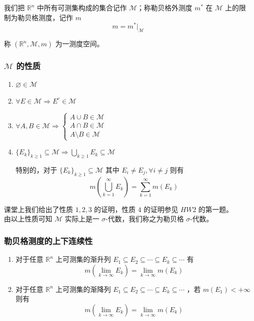 \documentclass{ctexbook}
\newcommand{\no}{\noindent}
\newcommand{\pro}{\no{\bf 证明：}}
\newcommand{\R}{\mathbb{R}}
\newcommand{\ITEMS}{\begin{enumerate}[leftmargin=4em]}
\newcommand{\ITEME}{\end{enumerate}}
\begin{document}
我们把 $\R^n$ 中所有可测集构成的集合记作 $\mathcal{M}$；称勒贝格外测度 $m^*$ 在 $\mathcal{M}$ 上的限制为勒贝格测度，记作 $m$
\[
	m = m^*|_\mathcal{M} 
\]

称 $(\R^n,\mathcal{M},m)$ 为一测度空间。

\subsubsection{$\mathcal{M}$ 的性质}
\ITEMS
	\item $\varnothing \in \mathcal{M}$
	\item $\forall E\in \mathcal{M} \Rightarrow E^c\in \mathcal{M}$
	\item $\forall A,B \in \mathcal{M} \Rightarrow \begin{cases} A \cup B \in \mathcal{M}\\ A \cap B \in \mathcal{M}\\ A \setminus B \in \mathcal{M}\end{cases}$
	\item $\{E_k\}_{k\ge1} \subseteq \mathcal{M} \Rightarrow \bigcup\limits_{k\ge1} E_k \subseteq \mathcal{M}$ 
	
	特别的，对于 $\{E_k\}_{k\ge1} \subseteq \mathcal{M}$ 其中 $E_i \neq E_j,\forall i\neq j$ 则有
	\[
		m\left(\bigcup_{k=1}^\infty E_k\right) = \sum_{k=1}^\infty m\left( E_k\right)
	\]
\ITEME

\pro 课堂上我们给出了性质 $1, 2, 3$ 的证明，性质 $4$ 的证明参见 $HW2$ 的第一题。\\

由以上性质可知 $\mathcal{M}$ 实际上是一 $\sigma$-代数，我们称之为勒贝格 $\sigma$-代数。

\subsubsection{勒贝格测度的上下连续性}
\ITEMS
	\item 对于任意 $\R^n$ 上可测集的渐升列 $E_1 \subseteq E_2 \subseteq \cdots \subseteq E_k \subseteq \cdots$ 有
	\[
		m\left(\lim_{k\to\infty} E_k\right) = \lim_{k\to\infty} m\left( E_k\right) 
	\]
	\item 对于任意 $\R^n$ 上可测集的渐降列 $E_1 \subseteq E_2 \subseteq \cdots \subseteq E_k \subseteq \cdots$ ，若 $m(E_1) < +\infty$ 则有
	\[
		m\left(\lim_{k\to\infty} E_k\right) = \lim_{k\to\infty} m\left( E_k\right) 
	\]
\ITEME
\end{document}
